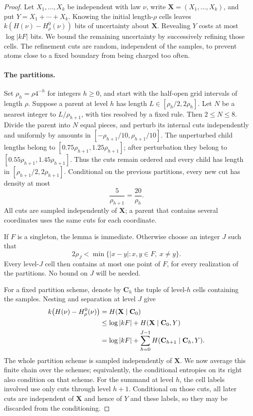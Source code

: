 \begin{proof}
Let $X_1,\ldots,X_k$ be independent with law $\nu$, write
$\mathbf X=(X_1,\ldots,X_k)$, and put $Y=X_1+\cdots+X_k$.
Knowing the initial length-$\rho$ cells leaves
$k(H(\nu)-H^0_\rho(\nu))$ bits of uncertainty about $\mathbf X$.
Revealing $Y$ costs at most $\log|kF|$ bits.  We bound the remaining
uncertainty by successively refining those cells.  The refinement cuts
are random, independent of the samples, to prevent atoms close to a
fixed boundary from being charged too often.

\paragraph{The partitions.}
Set $\rho_h=\rho4^{-h}$ for integers $h\ge0$, and start with the
half-open grid intervals of length $\rho$.  Suppose a parent at level
$h$ has length $L\in[\rho_h/2,2\rho_h]$.  Let $N$ be a nearest
integer to $L/\rho_{h+1}$, with ties resolved by a fixed rule.
Then $2\le N\le8$.  Divide the parent into $N$ equal pieces, and
perturb its internal cuts independently and uniformly by amounts in
$[-\rho_{h+1}/10,\rho_{h+1}/10]$.
The unperturbed child lengths belong to
$[0.75\rho_{h+1},1.25\rho_{h+1}]$; after perturbation they belong
to $[0.55\rho_{h+1},1.45\rho_{h+1}]$.  Thus the cuts remain ordered
and every child has length in $[\rho_{h+1}/2,2\rho_{h+1}]$.
Conditional on the previous partitions, every new cut has density
at most
\begin{equation}\label{eq:pair-cut-density}
 \frac{5}{\rho_{h+1}}=\frac{20}{\rho_h}.
\end{equation}
All cuts are sampled independently of $\mathbf X$; a parent that
contains several coordinates uses the same cuts for each coordinate.

If $F$ is a singleton, the lemma is immediate.  Otherwise choose
an integer $J$ such that
\[
 2\rho_J<\min\{|x-y|:x,y\in F,\ x\ne y\}.
\]
Every level-$J$ cell then contains at most one point of $F$, for
every realization of the partitions.  No bound on $J$ will be needed.

For a fixed partition scheme, denote by $\mathbf C_h$ the tuple of
level-$h$ cells containing the samples.  Nesting and separation at
level $J$ give
\begin{align}
 k\bigl(H(\nu)-H^0_\rho(\nu)\bigr)
 &=H(\mathbf X\mid\mathbf C_0)\notag\\
 &\le\log|kF|+H(\mathbf X\mid\mathbf C_0,Y)\notag\\
 &=\log|kF|+
   \sum_{h=0}^{J-1}H(\mathbf C_{h+1}\mid\mathbf C_h,Y).
 \label{eq:pair-chain}
\end{align}
The whole partition scheme is sampled independently of $\mathbf X$.
We now average this finite chain over the schemes; equivalently, the
conditional entropies on its right also condition on that scheme.
For the summand at level $h$, the cell labels involved use only cuts
through level $h+1$.
Conditional on those cuts, all later cuts are independent of
$\mathbf X$ and hence of $Y$ and these labels, so they may be
discarded from the conditioning.


\end{proof}
